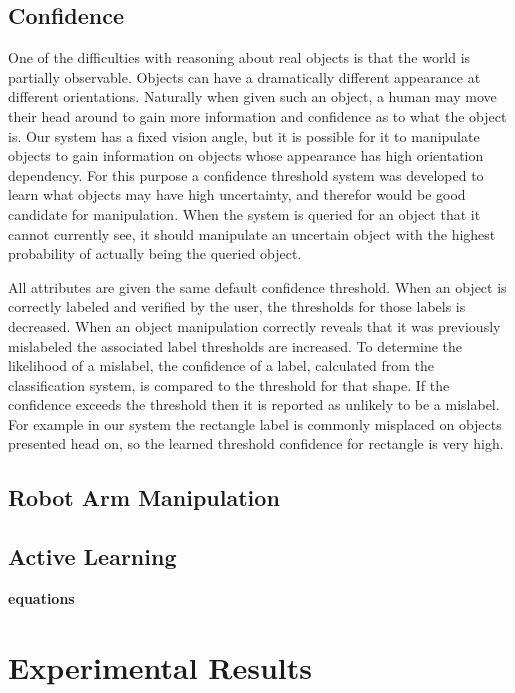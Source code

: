 \documentclass[11pt]{article}
\newcommand{\xxx}[1]{{\bf \color{red} #1}}
\begin{document}
\subsection{Confidence}
One of the difficulties with reasoning about real objects is that the world is
partially observable. Objects can have a dramatically different appearance at
different orientations.  Naturally when given such an object, a human may move
their head around to gain more information and confidence as to what the object is.
Our system has a fixed vision angle, but it is possible for it to
manipulate objects to gain information on objects whose appearance has high
orientation dependency.  For this purpose a confidence threshold system was
developed to learn what objects may have high uncertainty, and therefor would
be good candidate for manipulation.  When the system is queried for an object
that it cannot currently see, it should manipulate an uncertain object with the
highest probability of actually being the queried object.

All attributes are given the same default confidence threshold.  When an object
is correctly labeled and verified by the user, the thresholds for those labels
is decreased.  When an object manipulation correctly reveals that it was
previously mislabeled the associated label thresholds are increased.  To
determine the likelihood of a mislabel, the confidence of a label, calculated
from the classification system, is compared to the threshold for that shape.
If the confidence exceeds the threshold then it is reported as unlikely to be a
mislabel.  For example in our system the rectangle label is commonly misplaced
on objects presented head on, so the learned threshold confidence for rectangle
is very high.

\subsection{Robot Arm Manipulation}

\subsection{Active Learning}


\xxx{equations}
\section{Experimental Results}
\end{document}
